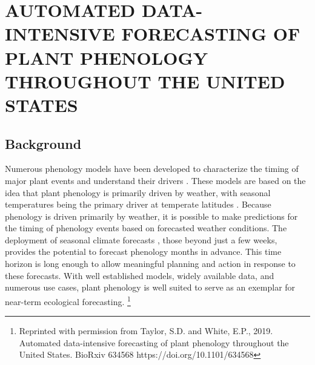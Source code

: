 \chapter{AUTOMATED DATA-INTENSIVE FORECASTING OF PLANT PHENOLOGY THROUGHOUT THE UNITED STATES}

\section{Background}

Numerous phenology models have been developed to characterize the timing of major plant events and understand their drivers \citep{chuine2013}. These models are based on the idea that plant phenology is primarily driven by weather, with seasonal temperatures being the primary driver at temperate latitudes \citep{chuine2017, basler2016}. Because phenology is driven primarily by weather, it is possible to make predictions for the timing of phenology events based on forecasted weather conditions. The deployment of seasonal climate forecasts \citep{weisheimer2014}, those beyond just a few weeks, provides the potential to forecast phenology months in advance. This time horizon is long enough to allow meaningful planning and action in response to these forecasts. With well established models, widely available data, and numerous use cases, plant phenology is well suited to serve as an exemplar for near-term ecological forecasting. \renewcommand*{\thefootnote}{}\footnote{Reprinted with permission from Taylor, S.D. and White, E.P., 2019. Automated data-intensive forecasting of plant phenology throughout the United States. BioRxiv 634568 https://doi.org/10.1101/634568}

